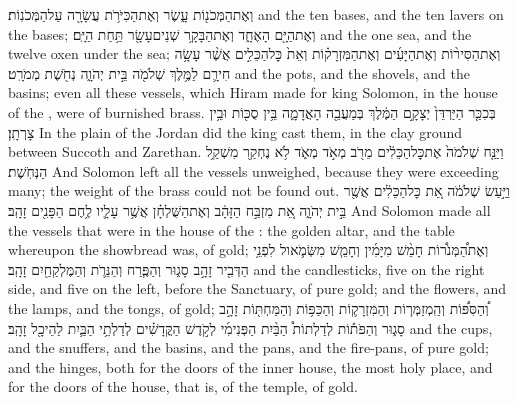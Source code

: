 \documentclass[11pt, openany]{book}
\begin{document}
{וְאֶת\maqqaf הַמְּכֹנ֖וֹת עָ֑שֶׂר וְאֶת\maqqaf הַכִּיֹּרֹ֥ת עֲשָׂרָ֖ה עַל\maqqaf הַמְּכֹנֽוֹת׃}
{and the ten bases, and the ten lavers on the bases;}
{וְאֶת\maqqaf הַיָּ֖ם הָאֶחָ֑ד וְאֶת\maqqaf הַבָּקָ֥ר שְׁנֵים\maqqaf עָשָׂ֖ר תַּ֥חַת הַיָּֽם׃}
{and the one sea, and the twelve oxen under the sea;}
{וְאֶת\maqqaf הַסִּיר֨וֹת וְאֶת\maqqaf הַיָּעִ֜ים וְאֶת\maqqaf הַמִּזְרָק֗וֹת וְאֵת֙ כׇּל\maqqaf הַכֵּלִ֣ים  אֲשֶׁ֨ר עָשָׂ֥ה חִירָ֛ם לַמֶּ֥לֶךְ שְׁלֹמֹ֖ה בֵּ֣ית יְהֹוָ֑ה נְחֹ֖שֶׁת מְמֹרָֽט׃}
{and the pots, and the shovels, and the basins; even all these vessels, which Hiram made for king Solomon, in the house of the \lord, were of burnished brass.}
{בְּכִכַּ֤ר הַיַּרְדֵּן֙ יְצָקָ֣ם הַמֶּ֔לֶךְ בְּמַעֲבֵ֖ה הָאֲדָמָ֑ה בֵּ֥ין סֻכּ֖וֹת וּבֵ֥ין צָרְתָֽן׃}
{In the plain of the Jordan did the king cast them, in the clay ground between Succoth and Zarethan.}
{וַיַּנַּ֤ח שְׁלֹמֹה֙ אֶת\maqqaf כׇּל\maqqaf הַכֵּלִ֔ים מֵרֹ֖ב מְאֹ֣ד מְאֹ֑ד לֹ֥א נֶחְקַ֖ר מִשְׁקַ֥ל הַנְּחֹֽשֶׁת׃}
{And Solomon left all the vessels unweighed, because they were exceeding many; the weight of the brass could not be found out.}
{וַיַּ֣עַשׂ שְׁלֹמֹ֔ה אֵ֚ת כׇּל\maqqaf הַכֵּלִ֔ים אֲשֶׁ֖ר בֵּ֣ית יְהֹוָ֑ה אֵ֚ת מִזְבַּ֣ח הַזָּהָ֔ב וְאֶת\maqqaf הַשֻּׁלְחָ֗ן אֲשֶׁ֥ר עָלָ֛יו לֶ֥חֶם הַפָּנִ֖ים זָהָֽב׃}
{And Solomon made all the vessels that were in the house of the \lord: the golden altar, and the table whereupon the showbread was, of gold;}
{וְאֶת\maqqaf הַ֠מְּנֹר֠וֹת חָמֵ֨שׁ מִיָּמִ֜ין וְחָמֵ֧שׁ מִשְּׂמֹ֛אול לִפְנֵ֥י הַדְּבִ֖יר זָהָ֣ב סָג֑וּר וְהַפֶּ֧רַח וְהַנֵּרֹ֛ת וְהַמֶּלְקַחַ֖יִם זָהָֽב׃}
{and the candlesticks, five on the right side, and five on the left, before the Sanctuary, of pure gold; and the flowers, and the lamps, and the tongs, of gold;}
{וְ֠הַסִּפּ֠וֹת וְהַֽמְזַמְּר֧וֹת וְהַמִּזְרָק֛וֹת וְהַכַּפּ֥וֹת וְהַמַּחְתּ֖וֹת זָהָ֣ב סָג֑וּר וְהַפֹּת֡וֹת לְדַלְתוֹת֩ הַבַּ֨יִת הַפְּנִימִ֜י לְקֹ֣דֶשׁ הַקֳּדָשִׁ֗ים לְדַלְתֵ֥י הַבַּ֛יִת לַהֵיכָ֖ל זָהָֽב׃ \petucha }
{and the cups, and the snuffers, and the basins, and the pans, and the fire-pans, of pure gold; and the hinges, both for the doors of the inner house, the most holy place, and for the doors of the house, that is, of the temple, of gold.}
\end{document}
